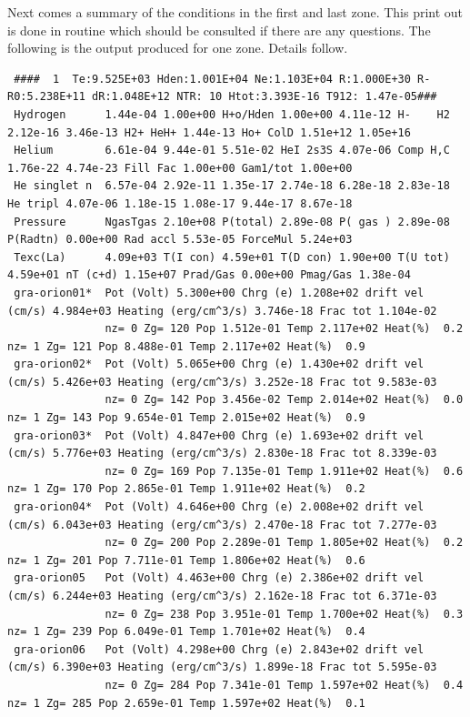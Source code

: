 Next comes a summary of the conditions in the first and last zone.
This print out is done in routine  which should
be consulted if there are any questions.
The following is the output produced for one zone.
Details follow.
{\setverbatimfontsize{\tiny}
\begin{verbatim}
 ####  1  Te:9.525E+03 Hden:1.001E+04 Ne:1.103E+04 R:1.000E+30 R-R0:5.238E+11 dR:1.048E+12 NTR: 10 Htot:3.393E-16 T912: 1.47e-05###
 Hydrogen      1.44e-04 1.00e+00 H+o/Hden 1.00e+00 4.11e-12 H-    H2 2.12e-16 3.46e-13 H2+ HeH+ 1.44e-13 Ho+ ColD 1.51e+12 1.05e+16
 Helium        6.61e-04 9.44e-01 5.51e-02 HeI 2s3S 4.07e-06 Comp H,C 1.76e-22 4.74e-23 Fill Fac 1.00e+00 Gam1/tot 1.00e+00
 He singlet n  6.57e-04 2.92e-11 1.35e-17 2.74e-18 6.28e-18 2.83e-18 He tripl 4.07e-06 1.18e-15 1.08e-17 9.44e-17 8.67e-18
 Pressure      NgasTgas 2.10e+08 P(total) 2.89e-08 P( gas ) 2.89e-08 P(Radtn) 0.00e+00 Rad accl 5.53e-05 ForceMul 5.24e+03
 Texc(La)      4.09e+03 T(I con) 4.59e+01 T(D con) 1.90e+00 T(U tot) 4.59e+01 nT (c+d) 1.15e+07 Prad/Gas 0.00e+00 Pmag/Gas 1.38e-04
 gra-orion01*  Pot (Volt) 5.300e+00 Chrg (e) 1.208e+02 drift vel (cm/s) 4.984e+03 Heating (erg/cm^3/s) 3.746e-18 Frac tot 1.104e-02
               nz= 0 Zg= 120 Pop 1.512e-01 Temp 2.117e+02 Heat(%)  0.2      nz= 1 Zg= 121 Pop 8.488e-01 Temp 2.117e+02 Heat(%)  0.9
 gra-orion02*  Pot (Volt) 5.065e+00 Chrg (e) 1.430e+02 drift vel (cm/s) 5.426e+03 Heating (erg/cm^3/s) 3.252e-18 Frac tot 9.583e-03
               nz= 0 Zg= 142 Pop 3.456e-02 Temp 2.014e+02 Heat(%)  0.0      nz= 1 Zg= 143 Pop 9.654e-01 Temp 2.015e+02 Heat(%)  0.9
 gra-orion03*  Pot (Volt) 4.847e+00 Chrg (e) 1.693e+02 drift vel (cm/s) 5.776e+03 Heating (erg/cm^3/s) 2.830e-18 Frac tot 8.339e-03
               nz= 0 Zg= 169 Pop 7.135e-01 Temp 1.911e+02 Heat(%)  0.6      nz= 1 Zg= 170 Pop 2.865e-01 Temp 1.911e+02 Heat(%)  0.2
 gra-orion04*  Pot (Volt) 4.646e+00 Chrg (e) 2.008e+02 drift vel (cm/s) 6.043e+03 Heating (erg/cm^3/s) 2.470e-18 Frac tot 7.277e-03
               nz= 0 Zg= 200 Pop 2.289e-01 Temp 1.805e+02 Heat(%)  0.2      nz= 1 Zg= 201 Pop 7.711e-01 Temp 1.806e+02 Heat(%)  0.6
 gra-orion05   Pot (Volt) 4.463e+00 Chrg (e) 2.386e+02 drift vel (cm/s) 6.244e+03 Heating (erg/cm^3/s) 2.162e-18 Frac tot 6.371e-03
               nz= 0 Zg= 238 Pop 3.951e-01 Temp 1.700e+02 Heat(%)  0.3      nz= 1 Zg= 239 Pop 6.049e-01 Temp 1.701e+02 Heat(%)  0.4
 gra-orion06   Pot (Volt) 4.298e+00 Chrg (e) 2.843e+02 drift vel (cm/s) 6.390e+03 Heating (erg/cm^3/s) 1.899e-18 Frac tot 5.595e-03
               nz= 0 Zg= 284 Pop 7.341e-01 Temp 1.597e+02 Heat(%)  0.4      nz= 1 Zg= 285 Pop 2.659e-01 Temp 1.597e+02 Heat(%)  0.1

\end{verbatim}}
